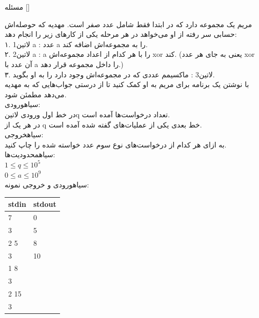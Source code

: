 

‌مسئله []

مریم یک مجموعه دارد که در ابتدا فقط شامل عدد صفر است. مهدیه که حوصله‌اش حسابی سر رفته از او می‌خواهد در هر مرحله یکی از کارهای زیر را انجام دهد: \\
۱. ‌لاتین{1 a} : عدد a را به مجموعه‌اش اضافه کند.\\
۲. ‌لاتین{2 a} : a را با هر کدام از اعداد مجموعه‌اش xor کند. (یعنی به جای هر عدد xor آن عدد با a را داخل مجموعه قرار دهد.)\\
۳. ‌لاتین{3} : ماکسیمم عددی که در مجموعه‌اش وجود دارد را به او بگوید.\\
با نوشتن یک برنامه برای مریم به او کمک کنید تا از درستی جواب‌هایی که به مهدیه می‌دهد مطمئن شود.\\

‌سیاه{ورودی:}\\
در خط اول ورودی ‌لاتین{q} تعداد درخواست‌ها آمده است.\\
در هر یک از q خط بعدی یکی از عملیات‌های گفته شده آمده است.\\

‌سیاه{خروجی:}\\
به ازای هر کدام از درخواست‌های نوع سوم عدد خواسته شده را چاپ کنید.\\

‌سیاه{محدودیت‌ها:}\\
$1 \leq q \leq 10^{5}$\\
$0 \leq a \leq 10^{9}$\\

‌سیاه{ورودی و خروجی نمونه:}\\

\begin{latin}
	\begin{tabularx}{\textwidth}{|X | X|}
		\hline
		\textbf{stdin} &
		\textbf{stdout}\\
		\hline
		7 & 0\\
		3 & 5\\
		2 5 & 8\\
		3 & 10\\
		1 8 & \\
		3&\\
		2 15&\\
		3&\\
		\hline
	\end{tabularx}
\end{latin}

